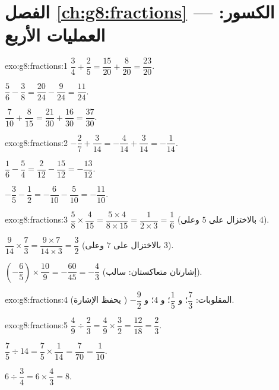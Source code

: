 \section*{الفصل \ref{ch:g8:fractions} --- الكسور: العمليات الأربع}

\begin{solution}{exo:g8:fractions:1}
$\dfrac34 + \dfrac25 = \dfrac{15}{20} + \dfrac{8}{20} =
\dfrac{23}{20}$.

$\dfrac56 - \dfrac38 = \dfrac{20}{24} - \dfrac{9}{24} =
\dfrac{11}{24}$.

$\dfrac{7}{10} + \dfrac{8}{15} = \dfrac{21}{30} + \dfrac{16}{30} =
\dfrac{37}{30}$.
\end{solution}

\begin{solution}{exo:g8:fractions:2}
$-\dfrac27 + \dfrac{3}{14} = -\dfrac{4}{14} + \dfrac{3}{14} =
-\dfrac{1}{14}$.

$\dfrac16 - \dfrac54 = \dfrac{2}{12} - \dfrac{15}{12} =
-\dfrac{13}{12}$.

$-\dfrac35 - \dfrac12 = -\dfrac{6}{10} - \dfrac{5}{10} =
-\dfrac{11}{10}$.
\end{solution}

\begin{solution}{exo:g8:fractions:3}
$\dfrac58 \times \dfrac{4}{15} = \dfrac{5 \times 4}{8 \times 15}
= \dfrac{1}{2 \times 3} = \dfrac16$ (بالاختزال على $5$ وعلى $4$).

$\dfrac{9}{14} \times \dfrac73 = \dfrac{9 \times 7}{14 \times 3}
= \dfrac{3}{2}$ (بالاختزال على $7$ وعلى $3$).

$\left(-\dfrac65\right) \times \dfrac{10}{9} = -\dfrac{60}{45}
= -\dfrac43$ (إشارتان متعاكستان: سالب).
\end{solution}

\begin{solution}{exo:g8:fractions:4}
المقلوبات: $\dfrac73$؛ \quad و $\dfrac15$؛ \quad و $4$؛ \quad
و $-\dfrac92$ ( يحفظ الإشارة).
\end{solution}

\begin{solution}{exo:g8:fractions:5}
$\dfrac49 \div \dfrac23 = \dfrac49 \times \dfrac32 = \dfrac{12}{18}
= \dfrac23$.

$\dfrac75 \div 14 = \dfrac75 \times \dfrac{1}{14} = \dfrac{7}{70}
= \dfrac{1}{10}$.

$6 \div \dfrac34 = 6 \times \dfrac43 = 8$.
\end{solution}

